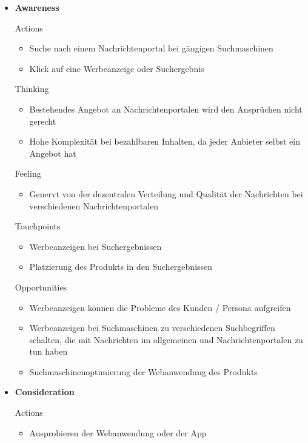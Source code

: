 \begin{itemize}
  \item \textbf{Awareness}

  Actions

  \begin{itemize}
    \item Suche nach einem Nachrichtenportal bei gängigen Suchmaschinen
    \item Klick auf eine Werbeanzeige oder Suchergebnis
  \end{itemize}

  Thinking

  \begin{itemize}
    \item Bestehendes Angebot an Nachrichtenportalen wird den Ansprüchen nicht gerecht
    \item Hohe Komplexität bei bezahlbaren Inhalten, da jeder Anbieter selbst ein Angebot hat
  \end{itemize}

  Feeling

  \begin{itemize}
    \item Genervt von der dezentralen Verteilung und Qualität der Nachrichten bei verschiedenen Nachrichtenportalen
  \end{itemize}

  Touchpoints

  \begin{itemize}
    \item Werbeanzeigen bei Suchergebnissen
    \item Platzierung des Produkts in den Suchergebnissen
  \end{itemize}

  Opportunities

  \begin{itemize}
    \item Werbeanzeigen können die Probleme des Kunden / Persona aufgreifen
    \item Werbeanzeigen bei Suchmaschinen zu verschiedenen Suchbegriffen schalten, die mit Nachrichten im allgemeinen und Nachrichtenportalen zu tun haben
    \item Suchmaschinenoptimierung der Webanwendung des Produkts
  \end{itemize}

  \item \textbf{Consideration}

  Actions

  \begin{itemize}
    \item Ausprobieren der Webanwendung oder der App
  \end{itemize}


\end{itemize}
